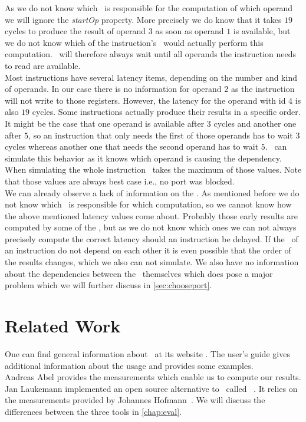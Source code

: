 As we do not know which \microop\ is responsible for the computation of which operand we will ignore the \emph{startOp} property. More precisely we do know that it takes $19$ cycles to produce the result of operand $3$ as soon as operand $1$ is available, but we do not know which of the instruction's \microops\ would actually perform this computation. \suaca\ will therefore always wait until all operands the instruction needs to read are available.\\
Most instructions have several latency items, depending on the number and kind of operands. In our case there is no information for operand $2$ as the instruction will not write to those registers. However, the latency for the operand with id $4$ is also $19$ cycles. Some instructions actually produce their results in a specific order. It might be the case that one operand is available after $3$ cycles and another one after $5$, so an instruction that only needs the first of those operands has to wait $3$ cycles whereas another one that needs the second operand has to wait $5$. \suaca\ can simulate this behavior as it knows which operand is causing the dependency. When simulating the whole instruction \suaca\ takes the maximum of those values. Note that those values are always best case i.e., no port was blocked.\\
We can already observe a lack of information on the \microops. As mentioned before we do not know which \microop\ is responsible for which computation, so we cannot know how the above mentioned latency values come about. Probably those early results are computed by some of the \microops, but as we do not know which ones we can not always precisely compute the correct latency should an instruction be delayed. If the \microops\ of an instruction do not depend on each other it is even possible that the order of the results changes, which we also can not simulate. We also have no information about the dependencies between the \microops\ themselves which does pose a major problem which we will further discuss in \autoref{sec:chooseport}.

\section{Related Work}

One can find general information about \iaca\ at its website \cite{iaca}. The user's guide \cite{userguide} gives additional information about the usage and provides some examples.\\

Andreas Abel \cite{Andreas} provides the measurements which enable us to compute our results.\\

Jan Laukemann \cite{osaca-thesis} implemented an open source alternative to \iaca\ called \osaca~\cite{osaca-web}. It relies on the measurements provided by Johannes Hofmann~\cite{ibench}. We will discuss the differences between the three tools in \autoref{chap:eval}.
